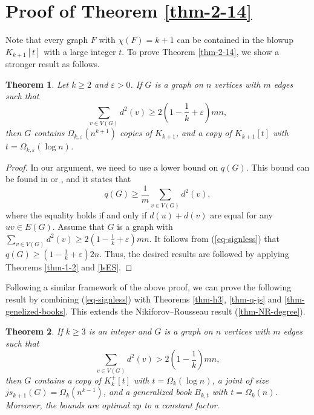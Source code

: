 \documentclass[11pt,a4paper]{article}
\theoremstyle{plain}
\newtheorem{theorem}{Theorem}[section]
\theoremstyle{definition}
\begin{document}
\section{Proof of Theorem \ref{thm-2-14}}

\label{sec-7}



Note that every graph $F$ with $\chi (F)=k+1$ can be contained in the blowup $K_{k+1}[t]$ with a large integer $t$. To prove Theorem \ref{thm-2-14}, 
we show a stronger result as follows. 

\begin{theorem} \label{thm-degree-1}
    Let $k\ge 2$ and $\varepsilon >0$. 
    If $G$ is a graph on $n$ vertices with $m$ edges such that 
    \[ \sum_{v\in V(G)}d^2(v) \ge 
    2\left(1- \frac{1}{k} +\varepsilon \right) mn, \] 
    then $G$ contains $\Omega_{k,\varepsilon}(n^{k+1})$ copies of $K_{k+1}$, and a copy of $K_{k+1}[t]$ with $t=\Omega_{k,\varepsilon}(\log n)$. 
\end{theorem}

\begin{proof}
In our argument, we need to use a lower bound on $q(G)$.
This bound can be found in \cite[Theorem 2.1]{LL2009-Zagreb} or \cite[Lemma 3]{Zhou2010}, and it states that
\begin{equation} \label{eq-signless}
  q (G) \ge \frac{1}{m} \sum_{v\in V(G)} d^2(v),
  \end{equation}
where the equality holds if and only if  $d(u)+d(v)$ are equal for
any $uv \in E(G)$.
Assume that $G$ is a graph with $\sum_{v\in V(G)}d^2(v) \ge 2 (1- \frac{1}{k} + \varepsilon)mn$. 
It follows from (\ref{eq-signless}) that 
$q(G)\ge (1- \frac{1}{k} + \varepsilon)2n$. 
Thus, the desired results are followed by applying Theorems \ref{thm-1-2} and \ref{lsES}. 
\end{proof}

Following a similar framework of the above proof, 
we can prove the following result 
 by combining (\ref{eq-signless}) with Theorems \ref{thm-h3}, \ref{thm-q-js} and \ref{thm-genelized-books}. 
This extends the Nikiforov--Rousseau result (\ref{thm-NR-degree}). 


\begin{theorem} \label{thm-degree-2}
    If $k\ge 3$ is an integer and $G$ is a graph on $n$ vertices with $m$ edges such that  
      \[ \sum_{v\in V(G)}d^2(v) > 
    2\left(1- \frac{1}{k} \right) mn,\]  
    then $G$ contains a copy of $K_k^+[t]$ with 
    $t=\Omega_k (\log n)$, a joint of size $js_{k+1}(G)=\Omega_k(n^{k-1})$, and a generalized book $B_{k,t}$ with $t=\Omega_k(n)$. Moreover, the bounds are optimal up to a constant factor. 
\end{theorem}
\end{document}
